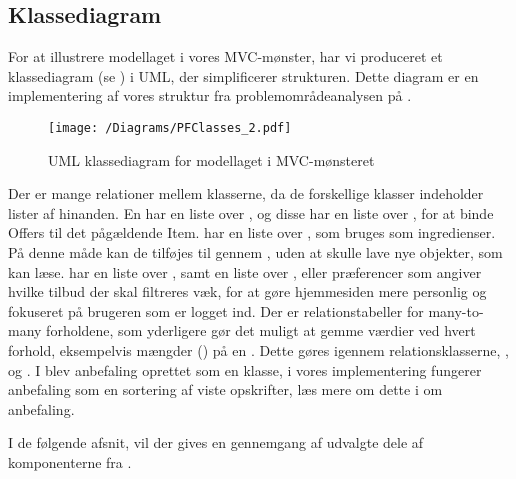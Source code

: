 \subsection{Klassediagram}
For at illustrere modellaget i vores MVC-mønster, har vi produceret et klassediagram (se ) i UML, der simplificerer strukturen. 
Dette diagram er en implementering af vores struktur fra problemområdeanalysen på .

\begin{figure}[h!]
\centering
 \texttt{[image: /Diagrams/PFClasses\_2.pdf]} %
\caption{UML klassediagram for modellaget i MVC-mønsteret}\label{diagram:klassediagram}
\end{figure}

Der er mange relationer mellem klasserne, da de forskellige klasser indeholder lister af hinanden.
En  har en liste over , og disse  har en liste over , for at binde Offers til det pågældende Item.
 har en liste over , som bruges som ingredienser.
På denne måde kan de tilføjes til  gennem , uden at skulle lave nye objekter, som  kan læse.
 har en liste over , samt en liste over , eller præferencer som angiver hvilke tilbud der skal filtreres væk, for at gøre hjemmesiden mere personlig og fokuseret på brugeren som er logget ind.
Der er relationstabeller for many-to-many forholdene, som yderligere gør det muligt at gemme værdier ved hvert forhold, eksempelvis mængder () på en .
Dette gøres igennem relationsklasserne, , og .
I  blev anbefaling oprettet som en klasse, i vores implementering fungerer anbefaling som en sortering af viste opskrifter, læs mere om dette i  om anbefaling.

I de følgende afsnit, vil der gives en gennemgang af udvalgte dele af komponenterne fra .
